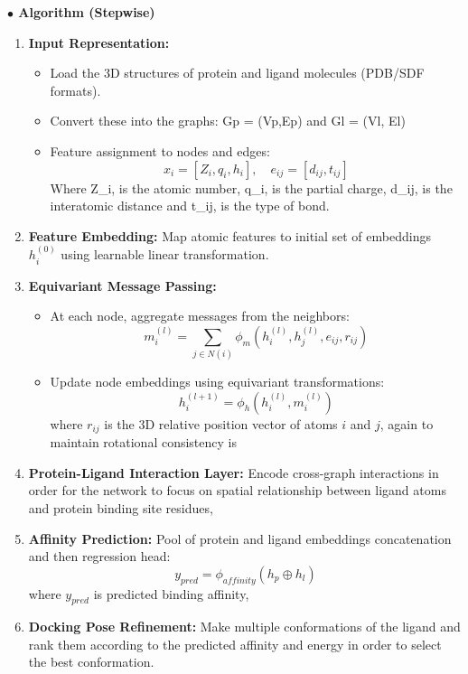 \documentclass[12pt,a4]{report}
\begin{document}
\vspace{0.3cm}
\noindent\textbf{\large $\bullet$ Algorithm (Stepwise)}
\begin{enumerate}
    \item \textbf{Input Representation:}
    \begin{itemize}
        \item Load the 3D structures of protein and ligand molecules (PDB/SDF formats).
        \item Convert these into the graphs: Gp = (Vp,Ep) and Gl = (Vl, El)
        \item Feature assignment to nodes and edges:
        \[
        x_i = [Z_i, q_i, h_i], \quad e_{ij} = [d_{ij}, t_{ij}]
        \]
        Where Z_i, is the atomic number, q_i, is the partial charge, d_ij, is the interatomic distance and t_ij, is the type of bond.
    \end{itemize}

    \item \textbf{Feature Embedding:}
    \hspace{0.3in}
    Map atomic features to initial set of embeddings \( h_i^{(0)} \) using learnable linear transformation.

    \item \textbf{Equivariant Message Passing: }
    \begin{itemize}
        \item At each node, aggregate messages from the neighbors:
        \[
        m_i^{(l)} = \sum_{j \in N(i)} \phi_m(h_i^{(l)}, h_j^{(l)}, e_{ij}, r_{ij})
        \]
        \item Update node embeddings using equivariant transformations:
        \[
        h_i^{(l+1)} = \phi_h(h_i^{(l)}, m_i^{(l)})
        \]
        where \( r_{ij}\) is the 3D relative position vector of atoms \( i \) and \( j \), again to maintain rotational consistency is
    \end{itemize}

    \item \textbf{Protein-Ligand Interaction Layer:}
    \hspace{0.3in}
    Encode cross-graph interactions in order for the network to focus on spatial relationship between ligand atoms and protein binding site residues,

    \item \textbf{Affinity Prediction:}
    \hspace{0.3in}
    Pool of protein and ligand embeddings concatenation and then regression head:
    \[
    y_{pred} = \phi_{affinity}(h_p \oplus h_l)
    \]
    where \( y_{pred} \) is predicted binding affinity,

    \item \textbf{Docking Pose Refinement:}
    \hspace{0.3in}
    Make multiple conformations of the ligand and rank them according to the predicted affinity and energy in order to select the best conformation.
\end{enumerate}
\end{document}
